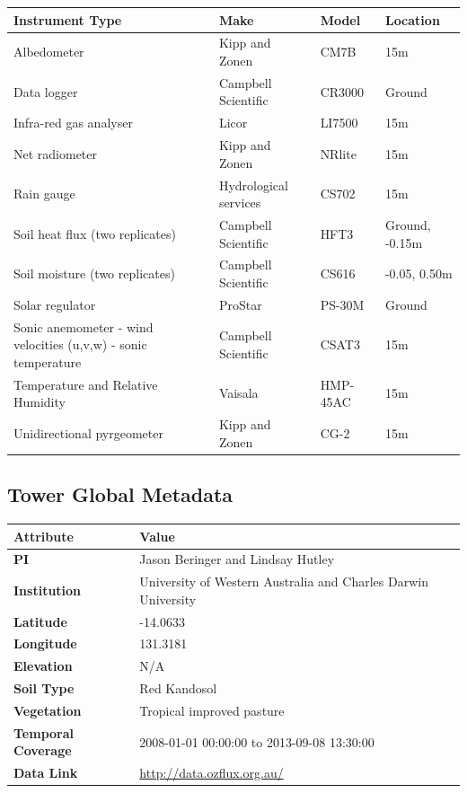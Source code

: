 \documentclass[11pt,a4paper]{article}
\begin{document}
\begin{longtable}{p{4.5cm}p{3.5cm}p{3.5cm}p{3.5cm}}
\toprule
\textbf{Instrument Type} & \textbf{Make} & \textbf{Model} & \textbf{Location} \\
\midrule
\endhead
\bottomrule
\endfoot
Albedometer & Kipp and Zonen & CM7B & 15m \\
Data  logger & Campbell Scientific & CR3000 & Ground \\
Infra-red  gas analyser & Licor & LI7500 & 15m \\
Net  radiometer & Kipp and Zonen & NRlite & 15m \\
Rain gauge & Hydrological services & CS702 & 15m \\
Soil  heat flux (two replicates) & Campbell Scientific & HFT3 & Ground,  -0.15m \\
Soil  moisture (two replicates) & Campbell Scientific & CS616 & -0.05,  0.50m \\
Solar  regulator & ProStar & PS-30M & Ground \\
Sonic anemometer       - wind velocities (u,v,w)        - sonic temperature & Campbell Scientific & CSAT3 & 15m \\
Temperature  and Relative Humidity & Vaisala & HMP-45AC & 15m \\
Unidirectional  pyrgeometer & Kipp and Zonen & CG-2 & 15m \\
\end{longtable}


\subsection*{Tower Global Metadata}

\begin{longtable}{p{4.5cm}p{10.5cm}}
\toprule
\textbf{Attribute} & \textbf{Value} \\
\midrule
\endhead
\bottomrule
\endfoot
\textbf{PI} & Jason Beringer and Lindsay Hutley \\
\textbf{Institution} & University of Western Australia and Charles Darwin University \\
\textbf{Latitude} & -14.0633 \\
\textbf{Longitude} & 131.3181 \\
\textbf{Elevation} & N/A \\
\textbf{Soil Type} & Red Kandosol \\
\textbf{Vegetation} & Tropical improved pasture \\
\textbf{Temporal Coverage} & 2008-01-01 00:00:00 to 2013-09-08 13:30:00 \\
\textbf{Data Link} & \url{http://data.ozflux.org.au/} \\
\end{longtable}
\end{document}
